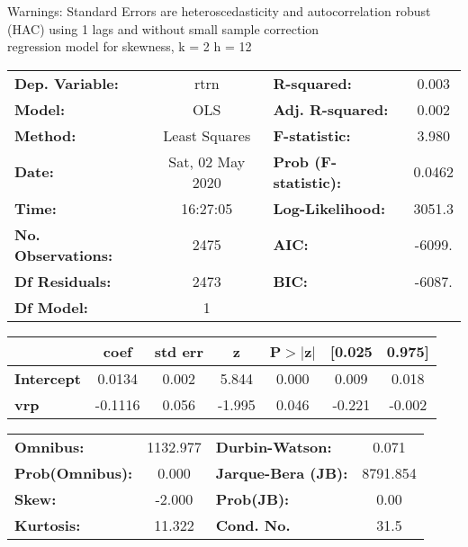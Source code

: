Warnings: \newline
 [1] Standard Errors are heteroscedasticity and autocorrelation robust (HAC) using 1 lags and without small sample correction\\ 

regression model for skewness, k = 2 h = 12\begin{center}
\begin{tabular}{lclc}
\toprule
\textbf{Dep. Variable:}    &       rtrn       & \textbf{  R-squared:         } &     0.003   \\
\textbf{Model:}            &       OLS        & \textbf{  Adj. R-squared:    } &     0.002   \\
\textbf{Method:}           &  Least Squares   & \textbf{  F-statistic:       } &     3.980   \\
\textbf{Date:}             & Sat, 02 May 2020 & \textbf{  Prob (F-statistic):} &   0.0462    \\
\textbf{Time:}             &     16:27:05     & \textbf{  Log-Likelihood:    } &    3051.3   \\
\textbf{No. Observations:} &        2475      & \textbf{  AIC:               } &    -6099.   \\
\textbf{Df Residuals:}     &        2473      & \textbf{  BIC:               } &    -6087.   \\
\textbf{Df Model:}         &           1      & \textbf{                     } &             \\
\bottomrule
\end{tabular}
\begin{tabular}{lcccccc}
                   & \textbf{coef} & \textbf{std err} & \textbf{z} & \textbf{P$> |$z$|$} & \textbf{[0.025} & \textbf{0.975]}  \\
\midrule
\textbf{Intercept} &       0.0134  &        0.002     &     5.844  &         0.000        &        0.009    &        0.018     \\
\textbf{vrp}       &      -0.1116  &        0.056     &    -1.995  &         0.046        &       -0.221    &       -0.002     \\
\bottomrule
\end{tabular}
\begin{tabular}{lclc}
\textbf{Omnibus:}       & 1132.977 & \textbf{  Durbin-Watson:     } &    0.071  \\
\textbf{Prob(Omnibus):} &   0.000  & \textbf{  Jarque-Bera (JB):  } & 8791.854  \\
\textbf{Skew:}          &  -2.000  & \textbf{  Prob(JB):          } &     0.00  \\
\textbf{Kurtosis:}      &  11.322  & \textbf{  Cond. No.          } &     31.5  \\
\bottomrule
\end{tabular}
\end{center}

